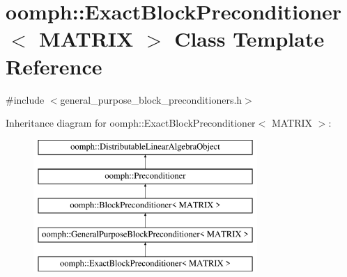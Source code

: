 \hypertarget{classoomph_1_1ExactBlockPreconditioner}{}\section{oomph\+:\+:Exact\+Block\+Preconditioner$<$ M\+A\+T\+R\+IX $>$ Class Template Reference}
\label{classoomph_1_1ExactBlockPreconditioner}


{\ttfamily \#include $<$general\+\_\+purpose\+\_\+block\+\_\+preconditioners.\+h$>$}

Inheritance diagram for oomph\+:\+:Exact\+Block\+Preconditioner$<$ M\+A\+T\+R\+IX $>$\+:\begin{figure}[H]
\begin{center}
\leavevmode
\includegraphics[height=5.000000cm]{classoomph_1_1ExactBlockPreconditioner}
\end{center}
\end{figure}
